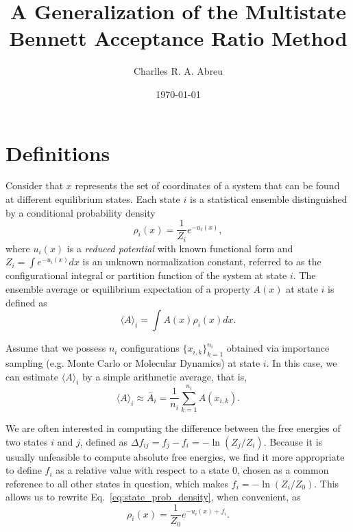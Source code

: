 \documentclass[aip,jcp,reprint,amsmath,amssymb]{revtex4-1}
\begin{document}
\title{A Generalization of the Multistate Bennett Acceptance Ratio Method}

\author{Charlles R. A. Abreu}

\date{\today}

\maketitle

\section{Definitions}
\label{sec:definitions}

Consider that $x$ represents the set of coordinates of a system that can be found at different equilibrium states. Each state $i$ is a statistical ensemble distinguished by a conditional probability density
\begin{equation}
\label{eq:state_prob_density}
\rho_i(x) = \frac{1}{Z_i} e^{-u_i(x)},
\end{equation}
where $u_i(x)$ is a \textit{reduced potential}\cite{Shirts_2008, Chodera_2011} with known functional form and $Z_i = \int e^{-u_i(x)}dx$ is an unknown normalization constant, referred to as the configurational integral or partition function of the system at state $i$. The ensemble average or equilibrium expectation of a property $A(x)$ at state $i$ is defined as
\begin{equation}
\label{eq:ensemble-average}
\langle A \rangle_i = \int A(x)\rho_i(x)dx.
\end{equation}

Assume that we possess $n_i$ configurations $\{x_{i,k}\}_{k=1}^{n_i}$ obtained via importance sampling (e.g. Monte Carlo or Molecular Dynamics)\cite{Allen_1987} at state $i$. In this case, we can estimate $\langle A \rangle_i$ by a simple arithmetic average, that is,
\begin{equation}
\label{eq:average_estimator}
\langle A \rangle_i \approx \overline A_i = \frac{1}{n_i} \sum_{k=1}^{n_i} A(x_{i,k}).
\end{equation}

We are often interested in computing the difference between the free energies of two states $i$ and $j$, defined as $\Delta f_{ij} = f_j - f_i = - \ln (Z_j/Z_i)$. Because it is usually unfeasible to compute absolute free energies, we find it more appropriate to define $f_i$ as a relative value with respect to a state $0$, chosen as a common reference to all other states in question, which makes $f_i = -\ln (Z_i/Z_0)$. This allows us to rewrite Eq.~\eqref{eq:state_prob_density}, when convenient, as
\begin{equation}
\label{eq:state_prob_density_Z0}
\rho_i(x) = \frac{1}{Z_0} e^{-u_i(x)+ f_i}.
\end{equation}
\end{document}
